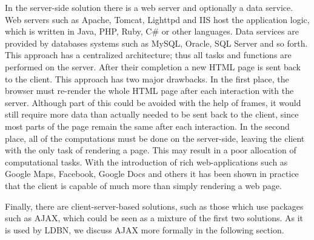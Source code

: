 In the server-side solution there is a web server and optionally a data service. 
Web servers such as Apache, Tomcat, Lighttpd and IIS host the application 
logic, which is written in Java, PHP, Ruby, C\# or other languages. 
Data services are provided by databases systems such as MySQL, Oracle, SQL Server and 
so forth. This approach has a centralized architecture; thus all tasks and 
functions are performed on the server. After their completion a new HTML page is 
sent back to the client. This approach has two major drawbacks. In the first place, 
the browser must re-render the whole HTML page after each interaction with the server.
Although part of this could be avoided with the help of frames, it would still 
require more data than actually needed to be sent back to the client, since most 
parts of the page remain the same after each interaction. In the second place, 
all of the computations must be done on the server-side, leaving the client with 
the only task of rendering a page. This may result in a poor allocation of computational tasks. 
With the introduction of rich web-applications such as Google Maps, Facebook, 
Google Docs and others it has been shown in practice that the client is capable of 
much more than simply rendering a web page. 

Finally, there are client-server-based solutions, such as those
which use packages such as AJAX, which could be
seen as a mixture 
of the first two solutions. As it is used by LDBN, we
discuss AJAX more formally in the following section.

